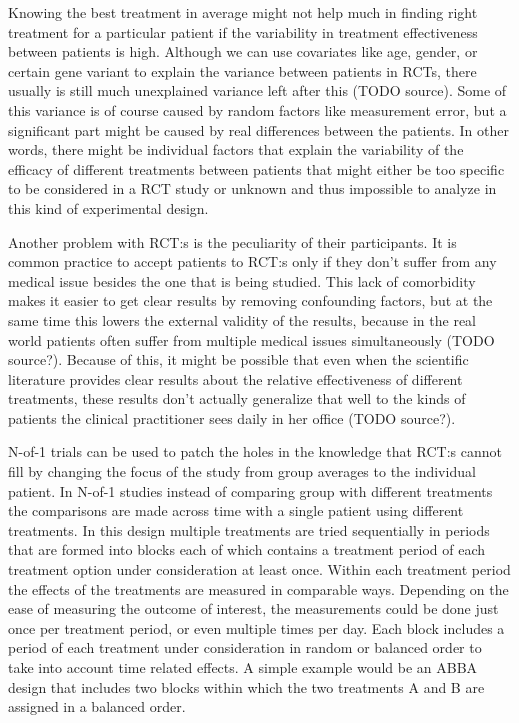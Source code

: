 \documentclass[12pt,a4paper,leqno]{report}
\theoremstyle{plain}
\theoremstyle{definition}
\theoremstyle{remark}
\begin{document}
Knowing the best treatment in average might not help much in finding right treatment for
a particular patient if the variability in treatment effectiveness between patients is
high. Although we can use covariates like age, gender, or certain gene variant to explain
the variance between patients in RCTs, there usually is still much unexplained variance
left after this (TODO source). Some of this variance is of course caused by random
factors like measurement error, but a significant part might be caused by real
differences between the patients. In other words, there might be individual factors that
explain the variability of the efficacy of different treatments between patients that
might either be too specific to be considered in a RCT study or unknown and thus
impossible to analyze in this kind of experimental design.

Another problem with RCT:s is the peculiarity of their participants. It is common
practice to accept patients to RCT:s only if they don't suffer from any medical issue
besides the one that is being studied. This lack of comorbidity makes it easier to get
clear results by removing confounding factors, but at the same time this lowers the
external validity of the results, because in the real world patients often suffer from
multiple medical issues simultaneously (TODO source?). Because of this, it might be
possible that even when the scientific literature provides clear results about the
relative effectiveness of different treatments, these results don't actually generalize
that well to the kinds of patients the clinical practitioner sees daily in her office
(TODO source?).

N-of-1 trials can be used to patch the holes in the knowledge that RCT:s cannot fill by
changing the focus of the study from group averages to the individual patient. In N-of-1
studies instead of comparing group with different treatments the comparisons are made
across time with a single patient using different treatments. In this design multiple
treatments are tried sequentially in periods that are formed into blocks each of which
contains a treatment period of each treatment option under consideration at least once.
Within each treatment period the effects of the treatments are measured in comparable
ways. Depending on the ease of measuring the outcome of interest, the measurements could
be done just once per treatment period, or even multiple times per day. Each block
includes a period of each treatment under consideration in random or balanced order to
take into account time related effects. A simple example would be an ABBA design that
includes two blocks within which the two treatments A and B are assigned in a balanced
order.
\end{document}
